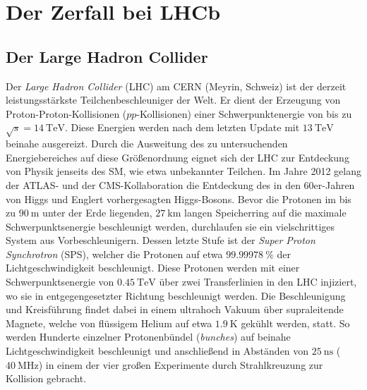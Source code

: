 \chapter{Der Zerfall bei LHCb}
\label{chap:3}
%
\section{Der Large Hadron Collider}
%
Der \textit{Large Hadron Collider} (LHC) am CERN (Meyrin, Schweiz) ist der derzeit leistungsstärkste Teilchenbeschleuniger der Welt. Er dient der Erzeugung von Proton-Proton-Kollisionen ($pp$-Kollisionen) einer Schwerpunktenergie von bis zu $\sqrt{s}=\SI{14}{\tera\electronvolt}$\cite{lhc}. Diese Energien werden nach dem letzten Update mit $\SI{13}{\tera\electronvolt}$ beinahe ausgereizt\cite{lhc}. Durch die Ausweitung des zu untersuchenden Energiebereiches auf diese Größenordnung eignet sich der LHC zur Entdeckung von Physik jenseits des SM, wie etwa unbekannter Teilchen. Im Jahre 2012 gelang der ATLAS- und der CMS-Kollaboration die Entdeckung des in den 60er-Jahren von Higgs und Englert vorhergesagten Higgs-Bosons\cite{higgs}.
Bevor die Protonen im bis zu $\SI{90}{\meter}$ unter der Erde liegenden, $\SI{27}{\kilo\meter}$ langen Speicherring auf die maximale Schwerpunktsenergie beschleunigt werden, durchlaufen sie ein vielschrittiges System aus Vorbeschleunigern. Dessen letzte Stufe ist der \textit{Super Proton Synchrotron} (SPS), welcher die Protonen auf etwa $\SI{99,99978}{\percent}$ der Lichtgeschwindigkeit beschleunigt\cite{lhc}. Diese Protonen werden mit einer Schwerpunktsenergie von $\SI{0,45}{\tera\electronvolt}$ über zwei Transferlinien in den LHC injiziert, wo sie in entgegengesetzter Richtung beschleunigt werden. Die Beschleunigung und Kreisführung findet dabei in einem ultrahoch Vakuum über supraleitende Magnete, welche von flüssigem Helium auf etwa $\SI{1,9}{\kelvin}$ gekühlt werden, statt. So werden Hunderte einzelner Protonenbündel (\textit{bunches}) auf beinahe Lichtgeschwindigkeit beschleunigt und anschließend in Abständen von $\SI{25}{\nano\second}$ ($\SI{40}{\mega\hertz}$) in einem der vier großen Experimente durch Strahlkreuzung zur Kollision gebracht.
%
